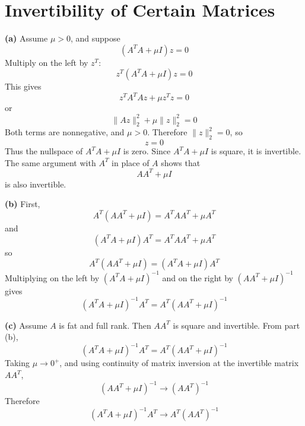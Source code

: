 \section{Invertibility of Certain Matrices}

\textbf{(a)}
Assume \(\mu>0\), and suppose
\[
(A^TA+\mu I)z=0
\]
Multiply on the left by \(z^T\):
\[
z^T(A^TA+\mu I)z=0
\]
This gives
\[
z^TA^TAz+\mu z^Tz=0
\]
or
\[
\|Az\|_2^2+\mu\|z\|_2^2=0
\]
Both terms are nonnegative, and \(\mu>0\). Therefore \(\|z\|_2^2=0\), so
\[
z=0
\]
Thus the nullspace of \(A^TA+\mu I\) is zero. Since \(A^TA+\mu I\) is square, it is invertible. The same argument with \(A^T\) in place of \(A\) shows that
\[
AA^T+\mu I
\]
is also invertible.

\textbf{(b)}
First,
\[
A^T(AA^T+\mu I)=A^TAA^T+\mu A^T
\]
and
\[
(A^TA+\mu I)A^T=A^TAA^T+\mu A^T
\]
so
\[
A^T(AA^T+\mu I)=(A^TA+\mu I)A^T
\]
Multiplying on the left by \((A^TA+\mu I)^{-1}\) and on the right by \((AA^T+\mu I)^{-1}\) gives
\[
(A^TA+\mu I)^{-1}A^T
=
A^T(AA^T+\mu I)^{-1}
\]

\textbf{(c)}
Assume \(A\) is fat and full rank. Then \(AA^T\) is square and invertible. From part (b),
\[
(A^TA+\mu I)^{-1}A^T
=
A^T(AA^T+\mu I)^{-1}
\]
Taking \(\mu\to 0^+\), and using continuity of matrix inversion at the invertible matrix \(AA^T\),
\[
(AA^T+\mu I)^{-1}\to (AA^T)^{-1}
\]
Therefore
\[
(A^TA+\mu I)^{-1}A^T
\to
A^T(AA^T)^{-1}
\]
